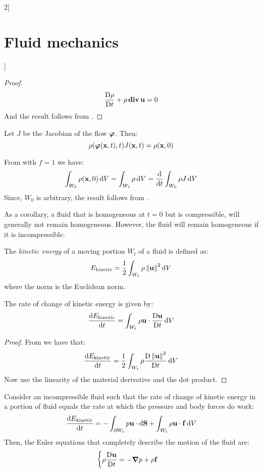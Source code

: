 \documentclass[../../../main_physics.tex]{subfiles}
\begin{document}
\begin{multicols}{2}[\section{Fluid mechanics}]
\begin{proof}
    $$
      \matdv{\rho}{t}+\rho\div\vf{u}=0
    $$
    And the result follows from .
  \end{proof}
  \begin{proposition}
    Let $J$ be the Jacobian of the flow $\vf\varphi$. Then:
    $$
      \rho(\vf\varphi(\vf{x},t),t)J(\vf{x},t)=\rho(\vf{x},0)
    $$
  \end{proposition}
  \begin{sproof}
    From  with $f=1$ we have:
    $$
      \int_{W_0}\rho(\vf{x},0)\dd{V}=\int_{W_t}\rho\dd{V}=\dv{}{t}\int_{W_0}\rho J\dd{V}
    $$
    Since, $W_0$ is arbitrary, the result follows from .
  \end{sproof}
  \begin{remark}
    As a corollary, a fluid that is homogeneous at $t = 0$ but is compressible, will generally not remain homogeneous. However, the fluid will remain homogeneous if it is incompressible.
  \end{remark}
  \begin{definition}
    The \emph{kinetic energy} of a moving portion $W_t$ of a fluid is defined as:
    $$
      E_\mathrm{kinetic}= \frac{1}{2}\int_{W_t}\rho\norm{\vf{u}}^2\dd{V}
    $$
    where the norm is the Euclidean norm.
  \end{definition}
  \begin{lemma}\label{FLM:lemmaEkinetic}
    The rate of change of kinetic energy is given by:
    $$
      \dv{E_\mathrm{kinetic}}{t}=\int_{W_t}\rho\vf{u}\cdot\matdv{\vf{u}}{t}\dd{V}
    $$
  \end{lemma}
  \begin{proof}
    From  we have that:
    $$
      \dv{E_\mathrm{kinetic}}{t}= \frac{1}{2}\int_{W_t}\rho\matdv{\norm{\vf{u}}^2}{t}\dd{V}
    $$
    Now use the linearity of the material derivative and the dot product.
  \end{proof}
  \begin{theorem}
    Consider an incompressible fluid such that the rate of change of kinetic energy in a portion of fluid equals the rate at which the pressure and body forces do work:
    $$
      \dv{E_\mathrm{kinetic}}{t}=-\int_{\partial W_t}p\vf{u}\cdot\dd{\vf{S}}+\int_{W_t}\rho\vf{u}\cdot\vf{f}\dd{V}
    $$
    Then, the Euler equations that completely describe the motion of the fluid are:
    $$
      \begin{cases}
        \displaystyle\rho \matdv{\vf{u}}{t}= -\grad p + \rho\vf{f} \\

\end{cases}$$
\end{theorem}
\end{multicols}
\end{document}
